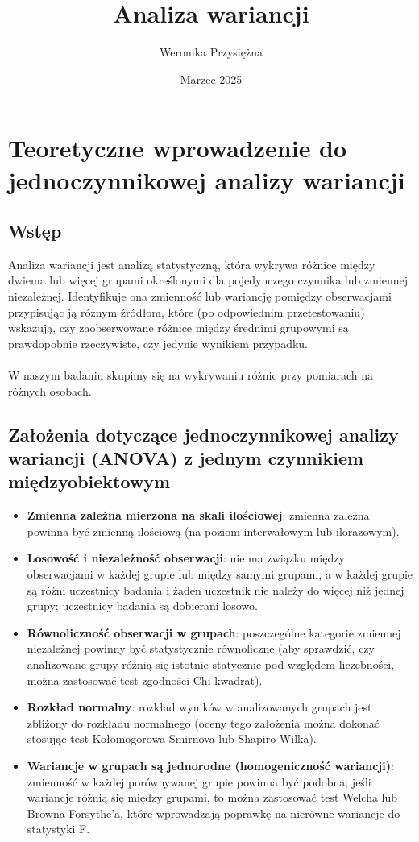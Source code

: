 \documentclass[12pt,a4paper]{article}
\title{Analiza wariancji}
\author{Weronika Przysiężna}
\date{Marzec 2025}
\begin{document}
\maketitle
\newpage
\section{Teoretyczne wprowadzenie do jednoczynnikowej analizy wariancji}

\subsection{Wstęp}
Analiza wariancji jest analizą statystyczną, która wykrywa różnice między dwiema lub więcej grupami określonymi dla pojedynczego czynnika lub zmiennej niezależnej. Identyfikuje ona zmienność lub wariancję pomiędzy obserwacjami przypisując ją różnym źródłom, które (po odpowiednim przetestowaniu) wskazują, czy zaobserwowane różnice między średnimi grupowymi są prawdopobnie rzeczywiste, czy jedynie wynikiem przypadku. \cite{witte2010statistics}\\
\\W naszym badaniu skupimy się na wykrywaniu różnic przy pomiarach na różnych osobach.

\subsection{Założenia dotyczące jednoczynnikowej analizy wariancji (ANOVA) z jednym czynnikiem międzyobiektowym \cite{orourke2005sas}}

\begin{itemize}
    \item \textbf{Zmienna zależna mierzona na skali ilościowej}: zmienna zależna powinna być zmienną ilościową (na poziom interwałowym lub ilorazowym).
    \item \textbf{Losowość i niezależność obserwacji}: nie ma związku między obserwacjami w każdej grupie lub między samymi grupami, a w każdej grupie są różni uczestnicy badania i żaden uczestnik nie należy do więcej niż jednej grupy;  uczestnicy badania są dobierani losowo.
    \item \textbf{Równoliczność obserwacji w grupach}: poszczególne kategorie zmiennej niezależnej powinny być statystycznie równoliczne (aby sprawdzić, czy analizowane grupy różnią się istotnie statycznie pod względem liczebności, można zastosować test zgodności Chi-kwadrat).
    \item \textbf{Rozkład normalny}: rozkład wyników w analizowanych grupach jest zbliżony do rozkładu normalnego (oceny tego założenia można dokonać stosując test Kołomogorowa-Smirnova lub Shapiro-Wilka).
    \item \textbf{Wariancje w grupach są jednorodne (homogeniczność wariancji)}: zmienność w każdej porównywanej grupie powinna być podobna; jeśli wariancje różnią się między grupami, to można zastosować test Welcha lub Browna-Forsythe'a, które wprowadzają poprawkę na nierówne wariancje do statystyki F.

\end{itemize}
\end{document}
